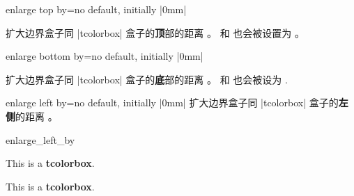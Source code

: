 \begin{docTcbKey}{enlarge top by}{=}{no default, initially |0mm|}


  扩大边界盒子同 |tcolorbox| 盒子的{\bf 顶}部的距离 。
   和
   也会被设置为 。
\end{docTcbKey}


\begin{docTcbKey}{enlarge bottom by}{=}{no default, initially |0mm|}

  扩大边界盒子同 |tcolorbox| 盒子的{\bf 底}部的距离 。
   和
   也会被设为 .
\end{docTcbKey}



\begin{docTcbKey}{enlarge left by}{=}{no default, initially |0mm|}
扩大边界盒子同 |tcolorbox| 盒子的{\bf 左侧}的距离 。
\begin{exdispExample}[safety=2cm]{enlarge_left_by}

\begin{tcolorbox}[enlarge left by=2cm,width=5cm,enhanced,show bounding box]
This is a \textbf{tcolorbox}.
\end{tcolorbox}
\begin{tcolorbox}[enlarge left by=-2cm,width=\linewidth+2cm]
This is a \textbf{tcolorbox}.
\end{tcolorbox}
\end{exdispExample}
\end{docTcbKey}

